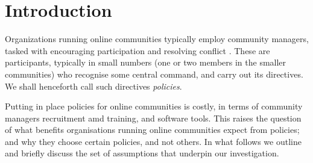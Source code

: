 \documentclass{bmcart}
\begin{document}

\section*{Introduction}
\label{intro}
Organizations running online communities typically employ community managers, tasked with encouraging participation and resolving conflict \cite{rheingold1993virtual}. 
These are participants, typically in small numbers (one or two members in the smaller communities) who recognise some central command, and carry out its directives. We shall henceforth call such directives \emph{policies}. 

Putting in place policies for online communities is costly, in terms of community managers recruitment amd training, and software tools. This raises the question of what benefits organisations running online communities expect from policies; and why they choose certain policies, and not others. In what follows we outline and briefly discuss the set of assumptions that underpin our investigation.
\end{document}
